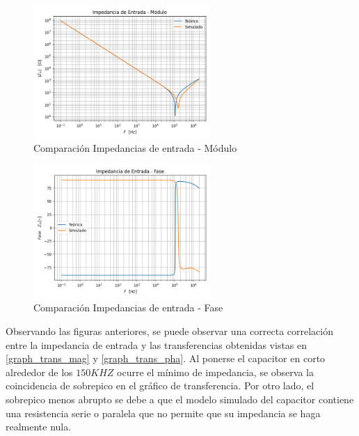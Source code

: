 \begin{figure}[H]
    \centering
    \includegraphics[width=0.6\textwidth]{../Ejercicio3-CircuitoIntegradoresyDerivadores/Imagenes/Derivador/Zin/Z_in_comparacion_mod.png}
    \caption{Comparación Impedancias de entrada - Módulo}
    \label{graph_z_in_mag}
\end{figure}
\begin{figure}[H]
    \centering
    \includegraphics[width=0.6\textwidth]{../Ejercicio3-CircuitoIntegradoresyDerivadores/Imagenes/Derivador/Zin/Z_in_comparacion_pha.png}
    \caption{Comparación Impedancias de entrada - Fase}
    \label{graph_z_in_pha}
\end{figure}
Observando las figuras anteriores, se puede observar una correcta correlación entre la impedancia de entrada 
y las transferencias obtenidas vistas en \ref{graph_trans_mag} y \ref{graph_trans_pha}. Al ponerse el capacitor
en corto alrededor de los $150KHZ$ ocurre el mínimo de impedancia, se observa la coincidencia de sobrepico 
en el gráfico de transferencia. Por otro lado, el sobrepico menos abrupto se debe a que el modelo 
simulado del capacitor contiene una resistencia serie o paralela que no permite que su impedancia se haga
realmente nula.

